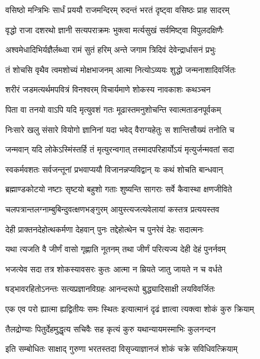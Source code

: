 \twolineshloka
{वसिष्ठो मन्त्रिभिः सार्धं प्रययौ राजमन्दिरम्}
{रुदन्तं भरतं दृष्ट्वा वसिष्ठः प्राह सादरम्} %

\twolineshloka
{वृद्धो राजा दशरथो ज्ञानी सत्यपराक्रमः}
{भुक्त्वा मर्त्यसुखं सर्वमिष्ट्वा विपुलदक्षिणैः} %

\twolineshloka
{अश्वमेधादिभिर्यज्ञैर्लब्ध्वा रामं सुतं हरिम्}
{अन्ते जगाम त्रिदिवं देवेन्द्रार्धासनं प्रभुः} %

\twolineshloka
{तं शोचसि वृथैव त्वमशोच्यं मोक्षभाजनम्}
{आत्मा नित्योऽव्ययः शुद्धो जन्मनाशादिवर्जितः} %

\twolineshloka
{शरीरं जडमत्यर्थमपवित्रं विनश्वरम्}
{विचार्यमाणे शोकस्य नावकाशः कथञ्चन} %

\twolineshloka
{पिता वा तनयो वाऽपि यदि मृत्युवशं गतः}
{मूढास्तमनुशोचन्ति स्वात्मताडनपूर्वकम्} %

\twolineshloka
{निःसारे खलु संसारे वियोगो ज्ञानिनां यदा}
{भवेद् वैराग्यहेतुः स शान्तिसौख्यं तनोति च} %

\twolineshloka
{जन्मवान् यदि लोकेऽस्मिंस्तर्हि तं मृत्युरन्वगात्}
{तस्मादपरिहार्योऽयं मृत्युर्जन्मवतां सदा} %

\twolineshloka
{स्वकर्मवशतः सर्वजन्तूनां प्रभवाप्ययौ}
{विजानन्नप्यविद्वान् यः कथं शोचति बान्धवान्} %

\twolineshloka
{ब्रह्माण्डकोटयो नष्टाः सृष्टयो बहुशो गताः}
{शुष्यन्ति सागराः सर्वे कैवास्था क्षणजीविते} %

\twolineshloka
{चलपत्रान्तलग्नाम्बुबिन्दुवत्क्षणभङ्गुरम्}
{आयुस्त्यजत्यवेलायां कस्तत्र प्रत्ययस्तव} %

\twolineshloka
{देही प्राक्तनदेहोत्थकर्मणा देहवान् पुनः}
{तद्देहोत्थेन च पुनरेवं देहः सदात्मनः} %

\twolineshloka
{यथा त्यजति वै जीर्णं वासो गृह्णाति नूतनम्}
{तथा जीर्णं परित्यज्य देही देहं पुनर्नवम्} %

\twolineshloka
{भजत्येव सदा तत्र शोकस्यावसरः कुतः}
{आत्मा न म्रियते जातु जायते न च वर्धते} %

\twolineshloka
{षड्भावरहितोऽनन्तः सत्यप्रज्ञानविग्रहः}
{आनन्दरूपो बुद्ध्यादिसाक्षी लयविवर्जितः} %

\twolineshloka
{एक एव परो ह्यात्मा ह्यद्वितीयः समः स्थितः}
{इत्यात्मानं दृढं ज्ञात्वा त्यक्त्वा शोकं कुरु क्रियाम्} %

\twolineshloka
{तैलद्रोण्याः पितुर्देहमुद्धृत्य सचिवैः सह}
{कृत्यं कुरु यथान्यायमस्माभिः कुलनन्दन} %

\twolineshloka
{इति सम्बोधितः साक्षाद् गुरुणा भरतस्तदा}
{विसृज्याज्ञानजं शोकं चक्रे सविधिवत्क्रियाम्} %

